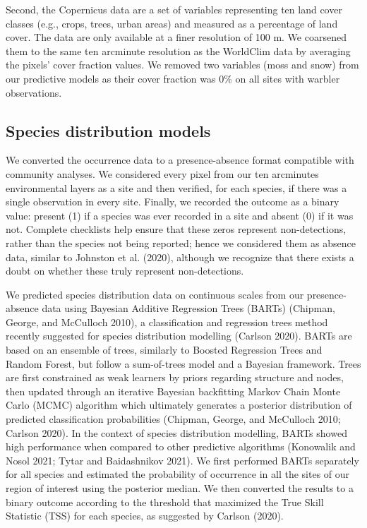 \documentclass[11pt]{article}
\begin{document}
Second, the Copernicus data are a set of variables representing ten land
cover classes (e.g., crops, trees, urban areas) and measured as a
percentage of land cover. The data are only available at a finer
resolution of 100 m. We coarsened them to the same ten arcminute
resolution as the WorldClim data by averaging the pixels' cover fraction
values. We removed two variables (moss and snow) from our predictive
models as their cover fraction was 0\% on all sites with warbler
observations.

\hypertarget{species-distribution-models}{%
\subsection{Species distribution
models}\label{species-distribution-models}}

We converted the occurrence data to a presence-absence format compatible
with community analyses. We considered every pixel from our ten
arcminutes environmental layers as a site and then verified, for each
species, if there was a single observation in every site. Finally, we
recorded the outcome as a binary value: present (1) if a species was
ever recorded in a site and absent (0) if it was not. Complete
checklists help ensure that these zeros represent non-detections, rather
than the species not being reported; hence we considered them as absence
data, similar to Johnston et al. (2020), although we recognize that
there exists a doubt on whether these truly represent non-detections.

We predicted species distribution data on continuous scales from our
presence-absence data using Bayesian Additive Regression Trees (BARTs)
(Chipman, George, and McCulloch 2010), a classification and regression
trees method recently suggested for species distribution modelling
(Carlson 2020). BARTs are based on an ensemble of trees, similarly to
Boosted Regression Trees and Random Forest, but follow a sum-of-trees
model and a Bayesian framework. Trees are first constrained as weak
learners by priors regarding structure and nodes, then updated through
an iterative Bayesian backfitting Markov Chain Monte Carlo (MCMC)
algorithm which ultimately generates a posterior distribution of
predicted classification probabilities (Chipman, George, and McCulloch
2010; Carlson 2020). In the context of species distribution modelling,
BARTs showed high performance when compared to other predictive
algorithms (Konowalik and Nosol 2021; Tytar and Baidashnikov 2021). We
first performed BARTs separately for all species and estimated the
probability of occurrence in all the sites of our region of interest
using the posterior median. We then converted the results to a binary
outcome according to the threshold that maximized the True Skill
Statistic (TSS) for each species, as suggested by Carlson (2020).
\end{document}
